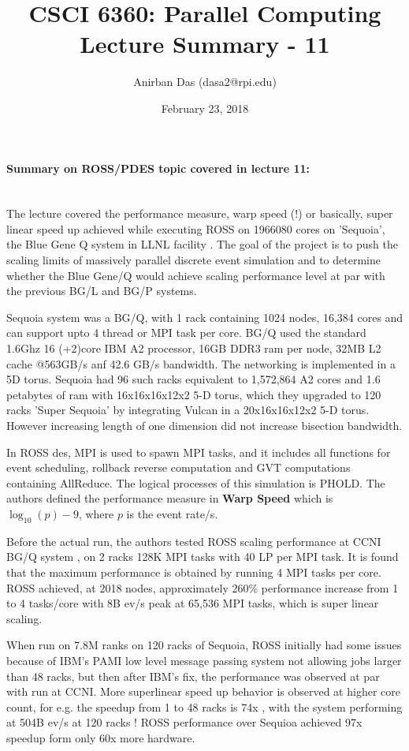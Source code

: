 \documentclass[a4paper,12 pt]{article}
\title{\vspace{-2.0cm}CSCI 6360: Parallel Computing Lecture Summary - 11}
\author{Anirban Das (dasa2@rpi.edu) }
\date{February 23, 2018}
\begin{document}
\maketitle

\paragraph{Summary on ROSS/PDES topic covered in lecture 11:\\\\}

The lecture covered the performance measure, warp speed (!) or basically, super linear speed up achieved while executing ROSS on 1966080 cores on 'Sequoia', the Blue Gene Q system in LLNL facility . The goal of the project is to push the scaling limits of massively parallel discrete event simulation and to determine whether the Blue Gene/Q would achieve scaling performance level at par with the previous BG/L and BG/P systems.

Sequoia system was a BG/Q, with 1 rack containing 1024 nodes, 16,384 cores and can support upto 4 thread or MPI task per core. BG/Q used the standard 1.6Ghz 16 (+2)core IBM A2 processor, 16GB DDR3 ram per node, 32MB L2 cache @563GB/s anf 42.6 GB/s bandwidth. The networking is implemented in a 5D torus. Sequoia had 96 such racks equivalent to 1,572,864 A2 cores and 1.6 petabytes of ram with 16x16x16x12x2 5-D torus, which they upgraded to 120 racks 'Super Sequoia' by integrating Vulcan in a 20x16x16x12x2 5-D torus. However increasing length of one dimension did not increase bisection bandwidth.

In ROSS des, MPI is used to spawn MPI tasks, and it includes all functions for event scheduling, rollback reverse computation and GVT computations containing AllReduce. The logical processes of this simulation is PHOLD. The authors defined the performance measure in \textbf{Warp Speed} which is $\log_{10}(p) -9$, where $p$ is the event rate/s.

Before the actual run, the authors tested ROSS scaling performance at CCNI BG/Q system , on 2 racks 128K MPI tasks with 40 LP per MPI task. It is found that the maximum performance is obtained by running 4 MPI tasks per core. ROSS achieved, at 2018 nodes, approximately 260\% performance increase from 1 to 4 tasks/core with 8B ev/s peak at 65,536 MPI tasks, which is super linear scaling. 

When run on 7.8M ranks on 120 racks of Sequoia, ROSS initially had some issues because of IBM's PAMI low level message passing system not allowing jobs larger than 48 racks, but then after IBM's fix, the performance was observed at par with run at CCNI. More superlinear speed up behavior is observed at higher core count, for e.g. the speedup from 1 to 48 racks is 74x , with the system performing at 504B ev/s at 120 racks ! ROSS performance over Sequioa achieved 97x speedup form only 60x more hardware. 
\end{document}
